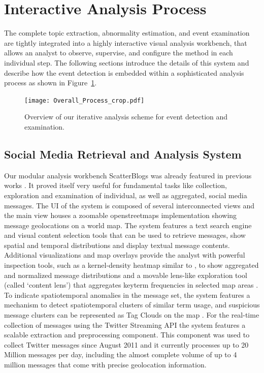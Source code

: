 \section{Interactive Analysis Process}
\label{sec:analysisprocess}
The complete topic extraction, abnormality estimation, and event examination are tightly integrated into a highly interactive visual analysis workbench, that allows an analyst to observe, supervise, and configure the method in each individual step. The following sections introduce the details of this system and describe how the event detection is embedded within a sophisticated analysis process as shown in Figure~\ref{fig:ad_process}.

\begin{figure}[ht]
	\centering
	\texttt{[image: Overall\_Process\_crop.pdf]}
	\caption{Overview of our iterative analysis scheme for event detection and examination.}
	\label{fig:ad_process}
\end{figure}


\subsection{Social Media Retrieval and Analysis System}
\label{subsec:analysis_system}
Our modular analysis workbench ScatterBlogs was already featured in previous works \cite{Bosch:2011:SGD,Thom:2012:SAD}. 
It proved itself very useful for fundamental tasks like collection, exploration and examination of individual, as well as aggregated, social media messages. The UI of the system is composed of several interconnected views and the main view houses a zoomable openstreetmaps implementation showing message geolocations on a world map. The system features a text search engine and visual content selection tools that can be used to retrieve messages, show spatial and temporal distributions and display textual message contents. Additional visualizations and map overlays provide the analyst with powerful inspection tools, such as a kernel-density heatmap similar to \cite{Maciejewski:2010:VAA}, to show aggregated and normalized message distributions and a movable lens-like exploration tool (called \textquoteleft content lens\textquoteright) that aggregates keyterm frequencies in selected map areas \cite{Bosch:2011:SGD}. To indicate spatiotemporal anomalies in the message set, the system features a mechanism to detect spatiotemporal clusters of similar term usage, and suspicious message clusters can be represented as Tag Clouds on the map \cite{Thom:2012:SAD}. For the real-time collection of messages using the Twitter Streaming API the system features a scalable extraction and preprocessing component. This component was used to collect Twitter messages since August 2011 and it currently processes up to 20 Million messages per day, including the almost complete volume of up to 4 million messages that come with precise geolocation information.

